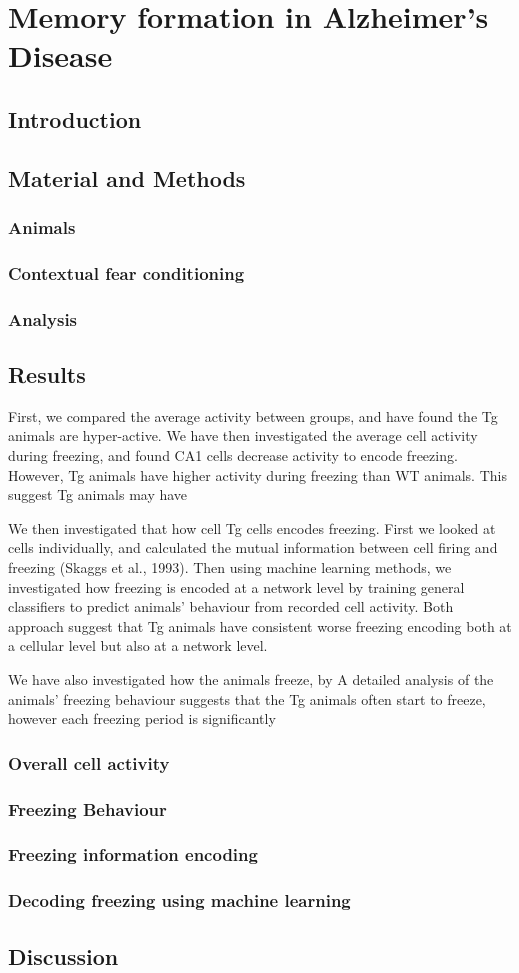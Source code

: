 \chapter{Memory formation in Alzheimer's Disease}
\section{Introduction}
\section{Material and Methods}
\subsection{Animals}
\subsection{Contextual fear conditioning}
\subsection{Analysis}
\section{Results}
First, we compared the average activity between groups, and have found the Tg animals are hyper-active. We have then investigated the average cell activity during freezing, and found CA1 cells decrease activity to encode freezing. However, Tg animals have higher activity during freezing than WT animals. This suggest Tg animals may have 

We then investigated that how cell Tg cells encodes freezing. First we looked at cells individually, and calculated the mutual information between cell firing and freezing (Skaggs et al., 1993). Then using machine learning methods, we investigated how freezing is encoded at a network level by training general classifiers to predict animals' behaviour from recorded cell activity. Both approach suggest that Tg animals have consistent worse freezing encoding both at a cellular level but also at a network level. 

We have also investigated how the animals freeze, by A detailed analysis of the animals' freezing behaviour suggests that the Tg animals often start to freeze, however each freezing period is significantly 
\subsection{Overall cell activity}
\subsection{Freezing Behaviour}
\subsection{Freezing information encoding}
\subsection{Decoding freezing using machine learning}
\section{Discussion}
